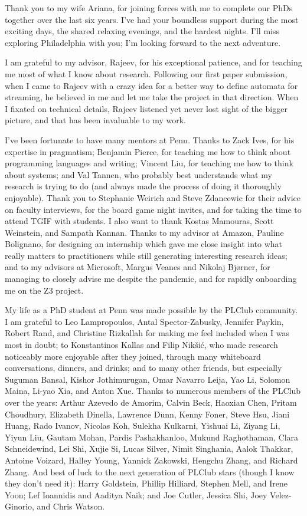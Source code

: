 Thank you to my wife Ariana, for joining forces with me to complete our PhDs together over the last six years.
I've had your boundless support during the most exciting days, the shared relaxing evenings, and the hardest nights.
I'll miss exploring Philadelphia with you; I'm looking forward to the next adventure.

I am grateful to my advisor, Rajeev, for his exceptional patience, and for teaching me most of what I know about research.
Following our first paper submission, when I came to Rajeev with a crazy idea for a better way to define automata for streaming, he believed in me and let me take the project in that direction.
When I fixated on technical details, Rajeev listened yet never lost sight of the bigger picture, and that has been invaluable to my work.

I've been fortunate to have many mentors at Penn. Thanks to Zack Ives, for his expertise in pragmatism; Benjamin Pierce, for teaching me how to think about programming languages and writing; Vincent Liu, for teaching me how to think about systems; and Val Tannen, who probably best understands what my research is trying to do (and always made the process of doing it thoroughly enjoyable).
Thank you to Stephanie Weirich and Steve Zdancewic for their advice on faculty interviews, for the board game night invites, and for taking the time to attend TGIF with students.
I also want to thank Kostas Mamouras, Scott Weinstein, and Sampath Kannan.
Thanks to my advisor at Amazon, Pauline Bolignano, for designing an internship which gave me close insight into what really matters to practitioners while still generating interesting research ideas; and to my advisors at Microsoft, Margus Veanes and Nikolaj Bjørner,
for managing to closely advise me despite the pandemic, and for rapidly onboarding me on the Z3 project.

My life as a PhD student at Penn was made possible by the PLClub community.
I am grateful to Leo Lampropoulos, Antal Spector-Zabusky, Jennifer Paykin, Robert Rand, and Christine Rizkallah for making me feel included when I was most in doubt;
to Konstantinos Kallas and Filip Nikšić, who made research noticeably more enjoyable after they joined, through many whiteboard conversations, dinners, and drinks;
and to many other friends, but especially Suguman Bansal, Kishor Jothimurugan, Omar Navarro Leija, Yao Li, Solomon Maina, Li-yao Xia, and Anton Xue.
Thanks to numerous members of the PLClub over the years:
Arthur Azevedo de Amorim,
Calvin Beck,
Haoxian Chen,
Pritam Choudhury,
Elizabeth Dinella,
Lawrence Dunn,
Kenny Foner,
Steve Hsu,
Jiani Huang,
Rado Ivanov,
Nicolas Koh,
Sulekha Kulkarni,
Yishuai Li,
Ziyang Li,
Yiyun Liu,
Gautam Mohan,
Pardis Pashakhanloo,
Mukund Raghothaman,
Clara Schneidewind,
Lei Shi,
Xujie Si,
Lucas Silver,
Nimit Singhania,
Aalok Thakkar,
Antoine Voizard,
Halley Young,
Yannick Zakowski,
Hengchu Zhang,
and
Richard Zhang.
And best of luck to the next generation of PLClub stars
(though I know they don't need it):
Harry Goldstein,
Phillip Hilliard,
Stephen Mell,
and Irene Yoon;
Lef Ioannidis
and Aaditya Naik;
and Joe Cutler, Jessica Shi, Joey Velez-Ginorio, and Chris Watson.

